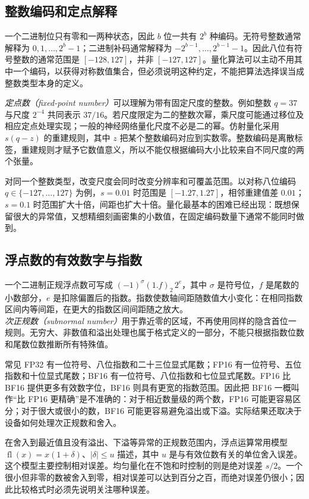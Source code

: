 \documentclass[UTF8,12pt,a4paper,fontset=fandol]{ctexart}
\begin{document}
\subsection{整数编码和定点解释}
一个二进制位只有零和一两种状态，因此 $b$ 位一共有 $2^b$ 种编码。无符号整数通常解释为 $0,1,\ldots,2^b-1$；二进制补码通常解释为 $-2^{b-1},\ldots,2^{b-1}-1$。因此八位有符号整数的通常范围是 $[-128,127]$，并非 $[-127,127]$。量化算法可以主动不用其中一个编码，以获得对称数值集合，但必须说明这种约定，不能把算法选择误当成整数类型本身的定义。

\emph{定点数（fixed-point number）}可以理解为带有固定尺度的整数。例如整数 $q=37$ 与尺度 $2^{-4}$ 共同表示 $37/16$。若尺度限定为二的整数次幂，乘尺度可能通过移位及相应定点处理实现；一般的神经网络量化尺度不必是二的幂。仿射量化采用 $s(q-z)$ 的重建规则，其中 $z$ 把某个整数编码对应到实数零。整数编码是离散标签，重建规则才赋予它数值意义，所以不能仅根据编码大小比较来自不同尺度的两个张量。

对同一个整数类型，改变尺度会同时改变分辨率和可覆盖范围。以对称八位编码 $q\in\{-127,\ldots,127\}$ 为例，$s=0.01$ 时范围是 $[-1.27,1.27]$，相邻重建值差 $0.01$；$s=0.1$ 时范围扩大十倍，间距也扩大十倍。量化最基本的困难已经出现：既想保留很大的异常值，又想精细刻画密集的小数值，在固定编码数量下通常不能同时做到。

\subsection{浮点数的有效数字与指数}
一个二进制正规浮点数可写成 $(-1)^\sigma(1.f)_2\,2^e$，其中 $\sigma$ 是符号位，$f$ 是尾数的小数部分，$e$ 是扣除偏置后的指数。指数使数轴间距随数值大小变化：在相同指数区间内等间距，在更大的指数区间间距随之放大。\emph{次正规数（subnormal number）}用于靠近零的区域，不再使用同样的隐含首位一规则。无穷大、非数值和溢出处理也属于格式定义的一部分，不能只根据指数位数和尾数位数推断所有特殊值。

常见 FP32 有一位符号、八位指数和二十三位显式尾数；FP16 有一位符号、五位指数和十位显式尾数；BF16 有一位符号、八位指数和七位显式尾数。FP16 比 BF16 提供更多有效数字位，BF16 则具有更宽的指数范围。因此把 BF16 一概叫作“比 FP16 更精确”是不准确的：对于相近数量级的两个数，FP16 可能更容易区分；对于很大或很小的数，BF16 可能更容易避免溢出或下溢。实际结果还取决于设备如何处理次正规数和舍入。

在舍入到最近值且没有溢出、下溢等异常的正规数范围内，浮点运算常用模型 $\operatorname{fl}(x)=x(1+\delta)$、$|\delta|\leq u$ 描述，其中 $u$ 是与有效位数有关的单位舍入误差。这个模型主要控制相对误差。均匀量化在不饱和时控制的则是绝对误差 $s/2$。一个很小但非零的数被舍入到零，相对误差可以达到百分之百，而绝对误差仍很小；因此比较格式时必须先说明关注哪种误差。
\end{document}
